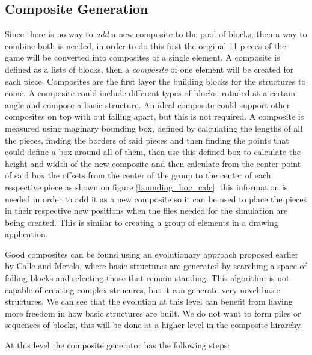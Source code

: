 \documentclass[conference]{IEEEtran}
\begin{document}
    \subsection{Composite Generation}

    Since there is no way to \textit{add} a new composite to the pool of blocks,
    then a way to combine both is needed, in order to do this first the original
    11 pieces of the game will be converted into composites of a single element.
    A composite is defined as a lists of blocks, then a \textit{composite} of
    one element will be created for each piece. Composites are the first layer
    the building blocks for the structures to come. A composite could include
    different types of blocks, rotaded at a certain angle and compose a basic
    structure. An ideal composite could support other composites on top with out
    falling apart, but this is not required. A composite is measured using
    maginary bounding box, defined by calculating the lengths of all the pieces,
    finding the borders of said pieces and then finding the points that could
    define a box around all of them, then use this defined box to calculate the
    height and width of the new composite and then calculate from the center
    point of said box the offsets from the center of the group to the center of
    each respective piece as shown on figure \ref{bounding_boc_calc}, this
    information is needed in order to add it as a new composite so it can be
    used to place the pieces in their respective new positions when the files
    needed for the simulation are being created. This is similar to creating a
    group of elements in a drawing application.

    Good composites can be found using an evolutionary approach proposed earlier 
    by Calle and Merelo, where basic structures are generated by searching a space
    of falling blocks and selecting those that remain standing. This algorithm is 
    not capable of creating complex strucures, but it can generate very novel basic
    structures. We can see that the evolution at this level can benefit from having
    more freedom in how basic structures are built. We do not want to form piles
    or sequences of blocks, this will be done at a higher level in the composite hirarchy.
    
    At this level the composite generator has the following steps:
    
    
\end{document}
